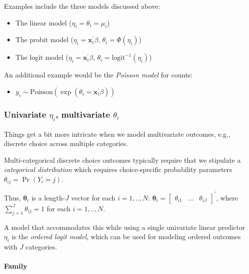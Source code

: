 \documentclass[
  11pt,
]{article}
\providecommand{\tightlist}{%
  \setlength{\itemsep}{0pt}\setlength{\parskip}{0pt}}
\begin{document}
Examples include the three models discussed above:

\begin{itemize}
\tightlist
\item
  The linear model (\(\eta_i = \theta_i = \mu_i\))
\item
  The probit model (\(\eta_i = \mathbf{x}_i^{\prime}\beta\), \(\theta_i = \Phi(\eta_i)\))
\item
  The logit model (\(\eta_i = \mathbf{x}_i^{\prime}\beta\), \(\theta_i = \text{logit}^{-1}(\eta_i)\))
\end{itemize}

An additional example would be the \emph{Poisson model} for counts:

\begin{itemize}
\tightlist
\item
  \(y_i \sim \text{Poisson}(\exp(\theta_i = \mathbf{x}_i^{\prime}\beta))\)
\end{itemize}

\hypertarget{univariate-eta_i-multivariate-theta_i}{%
\subsubsection{\texorpdfstring{Univariate \(\eta_i\), multivariate \(\theta_i\)}{Univariate \textbackslash eta\_i, multivariate \textbackslash theta\_i}}\label{univariate-eta_i-multivariate-theta_i}}

Things get a bit more intricate when we model multivariate outcomes, e.g., discrete choice across multiple categories.

Multi-categorical discrete choice outcomes typically require that we stipulate a \emph{categorical distribution} which requires choice-specific probability parameters \(\theta_{ij} = \Pr(Y_i = j)\).

Thus, \(\mathbf{\theta}_i\) is a length-\(J\) vector for each \(i=1,..,N\): \(\mathbf{\theta}_i = \begin{bmatrix} \theta_{i1} & \dots & \theta_{iJ}\end{bmatrix}^{\prime}\), where \(\sum_{j=1}^{J} \theta_{ij} = 1\) for each \(i=1,..,N\).

A model that accommodates this while using a single univariate linear predictor \(\eta_i\) is the \emph{ordered logit model}, which can be used for modeling ordered outcomes with \(J\) categories.

\hypertarget{family-1}{%
\paragraph{Family}\label{family-1}}
\end{document}
